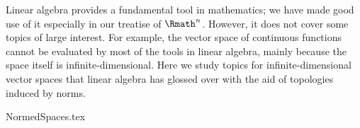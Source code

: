 \label{part:tvs}

Linear algebra provides a fundamental tool in mathematics;
we have made good use of it especially in our treatise of \(\Rmath^n\).
However, it does not cover some topics of large interest.
For example, the vector space of continuous functions
cannot be evaluated by most of the tools in linear algebra,
mainly because the space itself is infinite-dimensional.
Here we study topics for infinite-dimensional vector spaces
that linear algebra has glossed over with the aid of
topologies induced by norms.

{NormedSpaces.tex}